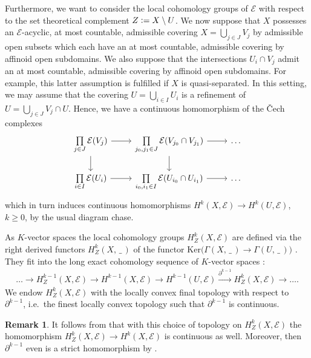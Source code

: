 \documentclass[a4paper, reqno, 10pt]{amsart}
\theoremstyle{definition}
\newtheorem{remark}[theorem]{Remark}
\numberwithin{equation}{section}
\newcommand{\blank}{{\,\_\,}}
\newcommand{\Coker}{{\mathrm{Coker}}}
\newcommand{\defeq}{\vcentcolon=}
\newcommand{\Ker}{{\mathrm{Ker}}}
\newcommand{\lra}{\longrightarrow}
\newcommand{\ra}{\rightarrow}
\newcommand{\CE}{{\mathcal {E}}}
\begin{document}
Furthermore, we want to consider the local cohomology groups of $\CE$ with respect to the set theoretical complement $Z \defeq X \setminus U$.
We now suppose that $X$ possesses an $\CE$-acyclic, at most countable, admissible covering $X = \bigcup_{j \in J} V_j$ by admissible open subsets which each have an at most countable, admissible covering by affinoid open subdomains.
We also suppose that the intersections $U_i \cap V_j$ admit an at most countable, admissible covering by affinoid open subdomains.
For example, this latter assumption is fulfilled if $X$ is quasi-separated.
In this setting, we may assume that the covering $U=\bigcup_{i \in I} U_i$ is a refinement of $U=\bigcup_{j \in J} V_j \cap U$.
Hence, we have a continuous homomorphism of the \v{C}ech complexes
\begin{equation*}
	\begin{tikzcd}
		\prod\limits_{j\in J} \CE(V_j) \ar[r]\ar[d]& \prod\limits_{j_0,j_1 \in J} \CE(V_{j_0}\cap V_{j_1}) \ar[r]\ar[d] & \ldots \\
		\prod\limits_{i\in I} \CE(U_i) \ar[r]& \prod\limits_{i_0,i_1 \in I} \CE(U_{i_0}\cap U_{i_1}) \ar[r] & \ldots
	\end{tikzcd}
\end{equation*}
which in turn induces continuous homomorphisms $H^k(X,\CE) \ra H^k(U,\CE)$, $k\geq 0$, by the usual diagram chase.



As $K$-vector spaces the local cohomology groups $H^k_Z(X,\CE)$ are defined via the right derived functors $H^k_Z(X,\blank)$ of the functor $\Ker\big(\Gamma(X,\blank)\ra \Gamma(U,\blank) \big)$ \cite[Exp.\ 2, Def.\ 2.1]{Grothendieck68SGA2}.
They fit into the long exact cohomology sequence of $K$-vector spaces \cite[Exp.\ 2, Cor.\ 2.9]{Grothendieck68SGA2}:
\begin{align}\label{Eq 2 - Long exact sequence of cohomology}
	\ldots \lra H^{k-1}_Z (X,\CE) \lra H^{k-1}(X,\CE) \lra H^{k-1} (U,\CE) \overset{\partial^{k-1}}{\lra} H^{k}_Z (X,\CE) \lra \ldots . 
\end{align}
We endow $H^k_Z(X,\CE)$ with the locally convex final topology with respect to $\partial^{k-1}$, i.e.\ the finest locally convex topology such that $\partial^{k-1}$ is continuous.



\begin{remark}\label{Rmk 2 - Strictness of edge homomorphism in long exact sequence of local cohomology}
	It follows from \cite[Lemma 5.1 (i)]{Schneider02NonArchFunctAna} that with this choice of topology on $H^k_Z(X,\CE)$ the homomorphism $H^k_Z(X,\CE) \ra H^k(X,\CE)$ is continuous as well.
	Moreover, then $\partial^{k-1}$ even is a strict homomorphism by .
\end{remark}
\end{document}

